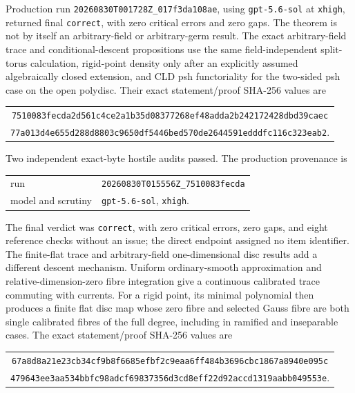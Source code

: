 Production run \nolinkurl{20260830T001728Z_017f3da108ae}, using
\texttt{gpt-5.6-sol} at \texttt{xhigh}, returned final
\texttt{correct}, with zero critical errors and zero gaps.  The theorem is
not by itself an arbitrary-field or arbitrary-germ result.
The exact arbitrary-field trace and conditional-descent propositions
use the same field-independent split-torus calculation, rigid-point density
only after an explicitly assumed algebraically closed extension, and CLD
psh functoriality for the two-sided psh case on the open polydisc.  Their
exact statement/proof SHA-256 values are
\begin{center}
\small
\begin{tabular}{@{}c@{}}
\nolinkurl{7510083fecda2d561c4ce2a1b35d08377268ef48adda2b242172428dbd39caec}\\
\nolinkurl{77a013d4e655d288d8803c9650df5446bed570de2644591edddfc116c323eab2}.
\end{tabular}
\end{center}
Two independent exact-byte hostile audits passed.  The production provenance
is
\begin{center}
\small
\begin{tabular}{@{}ll@{}}
run & \nolinkurl{20260830T015556Z_7510083fecda}\\
model and scrutiny & \texttt{gpt-5.6-sol}, \texttt{xhigh}.
\end{tabular}
\end{center}
The final verdict was \texttt{correct}, with zero critical errors, zero gaps,
and eight reference checks without an issue; the direct endpoint assigned no
item identifier.
The finite-flat trace and arbitrary-field one-dimensional disc results
 add a different descent mechanism.  Uniform
ordinary-smooth approximation and relative-dimension-zero fibre integration
give a continuous calibrated trace commuting with currents.  For a rigid
point, its minimal polynomial then produces a finite flat disc map whose
zero fibre and selected Gauss fibre are both single calibrated fibres of the
full degree, including in ramified and inseparable cases.  The exact
statement/proof SHA-256 values are
\begin{center}
\small
\begin{tabular}{@{}c@{}}
\nolinkurl{67a8d8a21e23cb34cf9b8f6685efbf2c9eaa6ff484b3696cbc1867a8940e095c}\\
\nolinkurl{479643ee3aa534bbfc98adcf69837356d3cd8eff22d92accd1319aabb049553e}.
\end{tabular}
\end{center}
